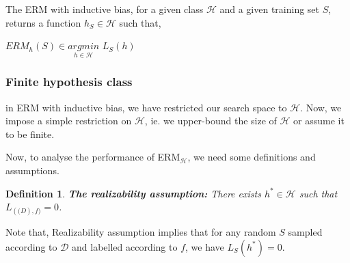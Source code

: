 \documentclass[a4paper]{article}
\newtheorem{definition}[theorem]{Definition}
\begin{document}
        The ERM with inductive bias, for a given class $\mathcal{H}$ and a given training set $S$, returns a function $h_S \in \mathcal{H}$ such that,
        \begin{center}
            $ERM_h(S) \in \underset{h \in \mathcal{H}}{argmin}$  \vspace{5px} $L_S(h)$
        \end{center}
        
        \subsubsection{Finite hypothesis class}
            in ERM with inductive bias, we have restricted our search space to $\mathcal{H}$. Now, we impose a simple restriction on $\mathcal{H}$, ie. we upper-bound the size of $\mathcal{H}$ or assume it to be finite.
            
            Now, to analyse the performance of ERM{$_\mathcal{H}$}, we need some definitions and assumptions.
            
            \begin{definition}
                \textbf{The realizability assumption: } There exists $h^* \in \mathcal{H}$ such that $L_{(\mathcal(D),f)} = 0$.
            \end{definition}
            
            Note that, Realizability assumption implies that for any random $S$ sampled according to $\mathcal{D}$ and labelled according to $f$, we have $L_S(h^*) = 0$.
\end{document}
